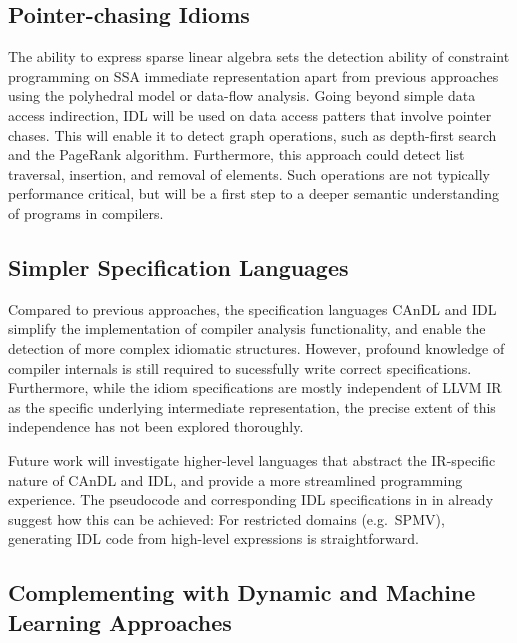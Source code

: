 \subsection*{Pointer-chasing Idioms}

    The ability to express sparse linear algebra sets the detection ability of
    constraint programming on SSA immediate representation apart from previous
    approaches using the polyhedral model or data-flow analysis.
    Going beyond simple data access indirection, IDL will be used on data access
    patters that involve pointer chases.
    This will enable it to detect graph operations, such as depth-first search
    and the PageRank algorithm.
    Furthermore, this approach could detect list traversal, insertion, and
    removal of elements.
    Such operations are not typically performance critical, but will be a first
    step to a deeper semantic understanding of programs in compilers.

\subsection*{Simpler Specification Languages}

    Compared to previous approaches, the specification languages CAnDL and IDL
    simplify the implementation of compiler analysis functionality, and enable
    the detection of more complex idiomatic structures.
    However, profound knowledge of compiler internals is still required to
    sucessfully write correct specifications.
    Furthermore, while the idiom specifications are mostly independent of
    LLVM IR as the specific underlying intermediate representation, the precise
    extent of this independence has not been explored thoroughly.

    Future work will investigate higher-level languages that abstract the
    IR-specific nature of CAnDL and IDL, and provide a more streamlined
    programming experience.
    The pseudocode and corresponding IDL specifications in
     in  already
    suggest how this can be achieved:
    For restricted domains (e.g.\ SPMV), generating IDL code from high-level
    expressions is straightforward.

\subsection*{Complementing with Dynamic and Machine Learning Approaches}

